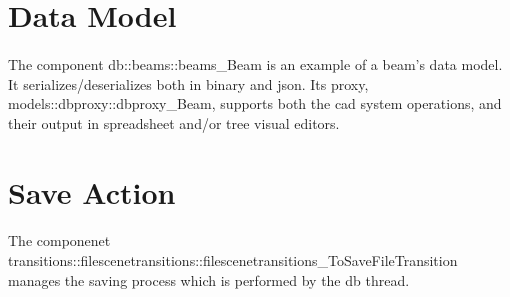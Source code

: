 \section{Data Model}
\paragraph{}
The component db::beams::beams\_Beam is an example of a beam's data model. It serializes/deserializes both in binary and json. Its proxy, models::dbproxy::dbproxy\_Beam, supports both the cad system operations, and their output in spreadsheet and/or tree visual editors.
\section{Save Action}
\paragraph{}
The componenet transitions::filescenetransitions::filescenetransitions\_ToSaveFileTransition manages the saving process which is performed by the db thread.
